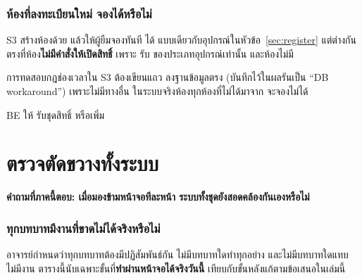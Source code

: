 \section{ห้องที่ลงทะเบียนใหม่ จองได้หรือไม่}
\label{sec:roomelig}

S3 สร้างห้องด้วย  แล้วให้ผู้ยืมจองทันที ได้ 
แบบเดียวกับอุปกรณ์ในหัวข้อ~\ref{sec:register} แต่ต่างกันตรงที่ห้อง\textbf{ไม่มีคำสั่งให้เปิดสิทธิ์}
เพราะ  รับ  ของประเภทอุปกรณ์เท่านั้น และห้องไม่มี 

\begin{badbox}[title={ห้องที่เจ้าหน้าที่เพิ่มเอง ไม่มีใครจองได้ตลอดไป}]
การทดสอบกฎช่องเวลาใน S3 ต้องเขียนแถว  ลงฐานข้อมูลตรง (บันทึกไว้ในผลรันเป็น ``DB workaround'')
เพราะไม่มีทางอื่น ในระบบจริงห้องทุกห้องที่ไม่ได้มาจาก  จะจองไม่ได้
\end{badbox}

\vbad{}
BE ให้  รับชุดสิทธิ์ หรือเพิ่ม 

\clearpage
\part{ตรวจตัดขวางทั้งระบบ}

\textbf{คำถามที่ภาคนี้ตอบ: เมื่อมองข้ามหน้าจอทีละหน้า ระบบทั้งชุดยังสอดคล้องกันเองหรือไม่}

\section{ทุกบทบาทมีงานที่ขาดไม่ได้จริงหรือไม่}
\label{sec:roles}

อาจารย์กำหนดว่าทุกบทบาทต้องมีปฏิสัมพันธ์กัน ไม่มีบทบาทใดทำทุกอย่าง และไม่มีบทบาทใดแทบไม่มีงาน
ตารางนี้นับเฉพาะขั้นที่\textbf{ทำผ่านหน้าจอได้จริงวันนี้} เทียบกับขั้นหลังแก้ตามข้อเสนอในเล่มนี้

